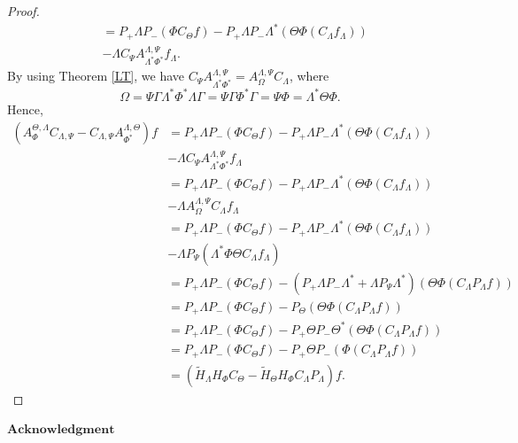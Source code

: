 \documentclass[12pt]{amsart}
\numberwithin{equation}{section}
\theoremstyle{definition}
\numberwithin{equation}{section}
\begin{document}
\begin{proof}
\begin{align*}
&=P_{+}\Lambda P_{-}(\Phi C_{\Theta}f)
-P_{+}\Lambda P_{-}\Lambda^{*}(\Theta\Phi ( C_{\Lambda}f_{\Lambda}))\\
&-\Lambda C_{\Psi}A_{\Lambda^{*}\Phi^{*}}^{\Lambda,\Psi}f_{\Lambda}.
\end{align*}
By using Theorem \ref{LT}, we have $C_{\Psi}A_{\Lambda^{*}\Phi^{*}}^{\Lambda,\Psi}=A_{\Omega}^{\Lambda,\Psi}C_{\Lambda}$, where
$$\Omega=\Psi\Gamma\Lambda^{*}\Phi^{*}\Lambda\Gamma=\Psi\Gamma\Phi^{*}\Gamma=\Psi\Phi=\Lambda^{*}\Theta\Phi.$$
Hence,
\begin{align*}
(A_{\Phi}^{\Theta,\Lambda}C_{\Lambda,\Psi}-C_{\Lambda,\Psi}A_{\Phi^{*}}^{\Lambda,\Theta})f
&=P_{+}\Lambda P_{-}(\Phi C_{\Theta}f)
-P_{+}\Lambda P_{-}\Lambda^{*}(\Theta\Phi ( C_{\Lambda}f_{\Lambda}))\\
&-\Lambda C_{\Psi}A_{\Lambda^{*}\Phi^{*}}^{\Lambda,\Psi}f_{\Lambda}\\
&=P_{+}\Lambda P_{-}(\Phi C_{\Theta} f)
-P_{+}\Lambda P_{-}\Lambda^{*}(\Theta\Phi ( C_{\Lambda}f_{\Lambda}))\\
&-\Lambda A_{\Omega}^{\Lambda,\Psi}C_{\Lambda} f_{\Lambda}\\
&=P_{+}\Lambda P_{-}(\Phi C_{\Theta} f)
-P_{+}\Lambda P_{-}\Lambda^{*}(\Theta\Phi ( C_{\Lambda}f_{\Lambda}))\\
&-\Lambda P_{\Psi}(\Lambda^{*}\Phi\Theta C_{\Lambda} f_{\Lambda})\\
&=P_{+}\Lambda P_{-}(\Phi C_{\Theta} f)
-(P_{+}\Lambda P_{-}\Lambda^{*}+\Lambda P_{\Psi}\Lambda^{*})(\Theta\Phi ( C_{\Lambda}P_{\Lambda}f))\\
&=P_{+}\Lambda P_{-}(\Phi C_{\Theta} f)
-P_{\Theta}(\Theta\Phi ( C_{\Lambda}P_{\Lambda}f))\\
&=P_{+}\Lambda P_{-}(\Phi C_{\Theta} f)
-P_{+}\Theta P_{-}\Theta^{*}(\Theta\Phi ( C_{\Lambda}P_{\Lambda}f))\\
&=P_{+}\Lambda P_{-}(\Phi C_{\Theta} f)
-P_{+}\Theta P_{-}(\Phi ( C_{\Lambda}P_{\Lambda}f))\\
&=(\widetilde{H}_{\Lambda}H_{\Phi}C_{\Theta}-\widetilde{H}_{\Theta}H_{\Phi}C_{\Lambda}P_{\Lambda})f.
\end{align*}
\end{proof}



\noindent $\mathbf{Acknowledgment}$
\end{document}

